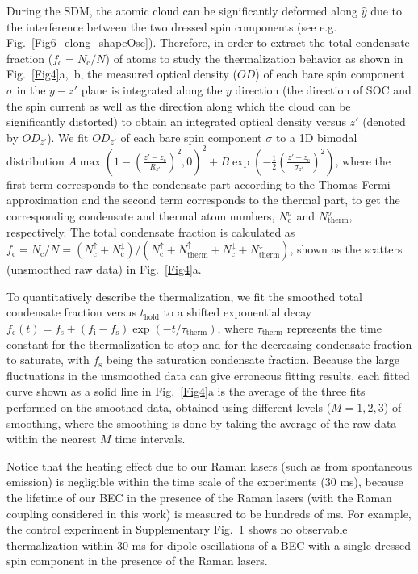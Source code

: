 \documentclass[showpacs,preprintnumbers,amsmath,amssymb, superscriptaddress, aps, reprint]{revtex4-1}
\def\thold{t_{\text{hold}}}
\begin{document}
{{{During the SDM, the atomic cloud can be significantly deformed along $\hat{y}$ due to the interference between the two dressed spin components (see e.g. {Fig.~{\ref{Fig6_elong_shapeOsc}}}). Therefore, in order to extract the total condensate fraction (${f_{\text{c}}} = {N_{\text{c}}}/N$) of atoms to study the thermalization behavior as shown in Fig.~\ref{Fig4}a,~b, the measured optical density ($OD$) of each bare spin component $\sigma$ in the $y-z'$ plane is integrated along the $y$ direction (the direction of SOC and the spin current as well as the direction along which the cloud can be significantly distorted) to obtain an integrated optical density versus $z'$ (denoted by $OD_{z'}$). We fit $OD_{z'}$ of each bare spin component $\sigma$ to a 1D bimodal distribution $A\max {\left( {1 - {{\left( {\frac{{z' - {z_{\text{c}}}}}{{R_{z'}}}} \right)}^2},0} \right)^2} + B\exp \left( { - \frac{1}{2}{{\left( {\frac{{z' - {z_{\text{c}}}}}{{\sigma _{z'}}}} \right)}^2}} \right)$, where the first term corresponds to the condensate part according to the Thomas-Fermi approximation and the second term corresponds to the thermal part, to get the corresponding condensate and thermal atom numbers, $N_{\text{c}}^\sigma$ and $N_{\text{therm}}^\sigma$, respectively. The total condensate fraction is calculated as ${f_{\text{c}}} = {N_{\text{c}}}/N = \left( {N_{\text{c}}^ \uparrow  + N_{\text{c}}^ \downarrow } \right)/\left( {N_{\text{c}}^ \uparrow  + N_{\text{therm}}^ \uparrow  + N_{\text{c}}^ \downarrow  + N_{\text{therm}}^ \downarrow } \right)$, shown as the scatters (unsmoothed raw data) in Fig.~\ref{Fig4}a.

To quantitatively describe the thermalization, we fit the smoothed total condensate fraction versus $\thold$ to a shifted exponential decay ${f_{\text{c}}}(t) = {f_{\text{s}}} + \left( {f_{\text{i}} - {f_{\text{s}}}} \right)\exp ( - t/{\tau_{\text{therm}}})$, where ${\tau_{\text{therm}}}$ represents the time constant for the thermalization to stop and for the decreasing condensate fraction to saturate, with $f_{\text{s}}$ being the saturation condensate fraction. Because the large fluctuations in the unsmoothed data can give erroneous fitting results, each fitted curve shown as a solid line in Fig.~\ref{Fig4}a is the average of the three fits performed on the smoothed data, obtained using different levels ($M=1, 2, 3$) of smoothing, where the smoothing is done by taking the average of the raw data within the nearest $M$ time intervals. 

Notice that the heating effect due to our Raman lasers (such as from spontaneous emission) is negligible within the time scale of the experiments ($30$ ms), because the lifetime of our BEC in the presence of the Raman lasers (with the Raman coupling considered in this work) is measured to be hundreds of ms. For example, the control experiment in Supplementary Fig.~1 shows no observable thermalization within $30$ ms for dipole oscillations of a BEC with a single dressed spin component in the presence of the Raman lasers.



}}}
\end{document}
